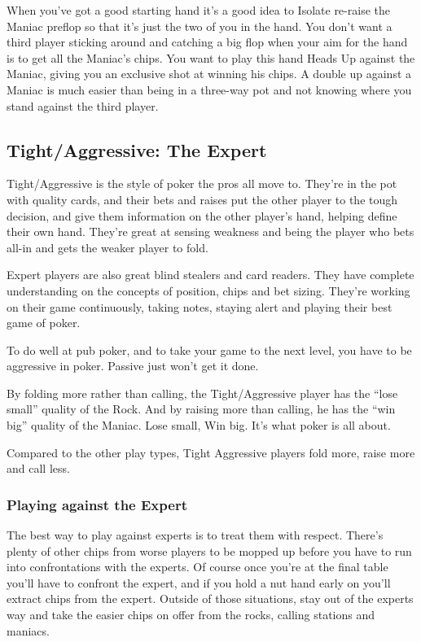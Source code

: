 When you've got a good starting hand it's a good idea to Isolate
re-raise the Maniac preflop so that it's just the two of you in the
hand. You don't want a third player sticking around and catching a big
flop when your aim for the hand is to get all the Maniac's chips.
You want to play this hand Heads Up against the Maniac, giving you an
exclusive shot at winning his chips. A double up against a Maniac is
much easier than being in a three-way pot and not knowing where you
stand against the third player.

\subsection{Tight/Aggressive: The Expert}

Tight/Aggressive is the style of poker the pros all move to. They're
in the pot with quality cards, and their bets and raises put the
other player to the tough decision, and give them information on
the other player's hand, helping define their own hand. They're great
at sensing weakness and being the player who bets all-in and gets
the weaker player to fold.

Expert players are also great blind stealers and card readers.
They have complete understanding on
the concepts of position, chips and bet sizing. They're working on
their game continuously, taking notes, staying alert and playing
their best game of poker.

To do well at pub poker, and to take your game to the next level,
you have to be aggressive in poker. Passive just won't get it done.

By folding more rather than calling, the Tight/Aggressive player
has the ``lose small'' quality of the Rock. And by raising more than
calling, he has the ``win big'' quality of the Maniac. Lose small, Win big.
It's what poker is all about.

Compared to the other play types, Tight Aggressive players fold more,
raise more and call less.

\subsubsection{Playing against the Expert}

The best way to play against experts
is to treat them with respect. There's plenty of other chips
from worse players to be mopped up before you have to run into
confrontations with the experts. Of course once you're at the final
table you'll have to confront the expert, and if you hold a nut hand
early on you'll extract chips from the expert. Outside of those
situations, stay out of the experts way and take the easier chips
on offer from the rocks, calling stations and maniacs.

